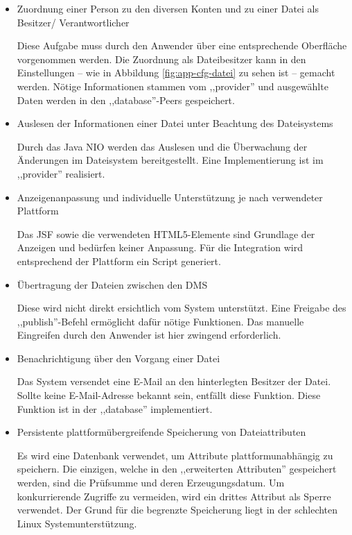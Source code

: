 \documentclass[oneside, ngerman, toc=bibliography,bibliography=totoc,listof=entryprefix, open=right,numbers=noenddot,fontsize=12pt]{scrbook}
\begin{document}
\begin{itemize}
	\item Zuordnung einer Person zu den diversen Konten und zu einer Datei als Besitzer/ Verantwortlicher
    
	Diese Aufgabe muss durch den Anwender über eine entsprechende Oberfläche vorgenommen werden. Die Zuordnung als Dateibesitzer kann in den Einstellungen -- wie in Abbildung \ref{fig:app-cfg-datei} zu sehen ist -- gemacht werden. Nötige Informationen  stammen vom ,,provider'' und ausgewählte Daten werden in den ,,database''-Peers gespeichert.
	
	\item Auslesen der Informationen einer Datei unter Beachtung des Dateisystems 
    
	Durch das Java NIO werden das Auslesen und die Überwachung der Änderungen im Dateisystem bereitgestellt.
    Eine Implementierung ist im ,,provider'' realisiert.

    \item Anzeigenanpassung und individuelle Unterstützung je nach verwendeter Plattform 
    
	Das JSF sowie die verwendeten HTML5-Elemente sind Grundlage der Anzeigen und bedürfen keiner Anpassung. Für die Integration wird entsprechend der Plattform ein Script generiert.
    
	\item Übertragung der Dateien zwischen den DMS
    
   Diese wird nicht direkt ersichtlich vom System unterstützt. Eine Freigabe des ,,publish''-Befehl ermöglicht dafür nötige Funktionen. Das manuelle Eingreifen durch den Anwender ist hier zwingend erforderlich.
   
	\item Benachrichtigung über den Vorgang einer Datei
    
	Das System versendet eine E-Mail an den hinterlegten Besitzer der Datei. Sollte keine E-Mail-Adresse bekannt sein, entfällt diese Funktion. Diese Funktion ist in der ,,database'' implementiert.
   
	\item Persistente plattformübergreifende Speicherung von Dateiattributen
    
	Es wird eine Datenbank verwendet, um Attribute plattformunabhängig zu speichern.
    Die einzigen, welche in den ,,erweiterten Attributen'' gespeichert werden, sind die Prüfsumme und deren Erzeugungsdatum. Um konkurrierende Zugriffe zu vermeiden, wird ein drittes Attribut als Sperre verwendet. Der Grund für die begrenzte Speicherung liegt in der schlechten Linux Systemunterstützung.


\end{itemize}
\end{document}
